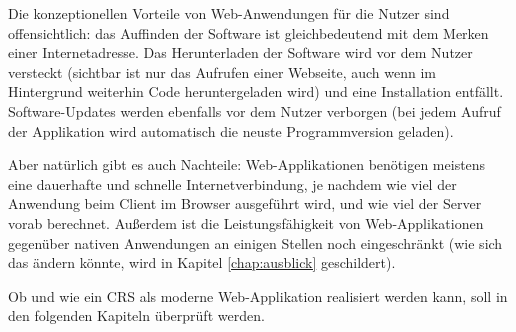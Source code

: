 Die konzeptionellen Vorteile von Web-Anwendungen für die Nutzer sind offensichtlich: das Auffinden der Software ist gleichbedeutend mit dem Merken einer Internetadresse. Das Herunterladen der Software wird vor dem Nutzer versteckt (sichtbar ist nur das Aufrufen einer Webseite, auch wenn im Hintergrund weiterhin Code heruntergeladen wird) und eine Installation entfällt. Software-Updates werden ebenfalls vor dem Nutzer verborgen (bei jedem Aufruf der Applikation wird automatisch die neuste Programmversion geladen).

Aber natürlich gibt es auch Nachteile: Web-Applikationen benötigen meistens eine dauerhafte und schnelle Internetverbindung, je nachdem wie viel der Anwendung beim Client im Browser ausgeführt wird, und wie viel der Server vorab berechnet. Außerdem ist die Leistungsfähigkeit von Web-Applikationen gegenüber nativen Anwendungen an einigen Stellen noch eingeschränkt (wie sich das ändern könnte, wird in Kapitel \ref{chap:ausblick} geschildert).

Ob und wie ein CRS als moderne Web-Applikation realisiert werden kann, soll in den folgenden Kapiteln überprüft werden.


